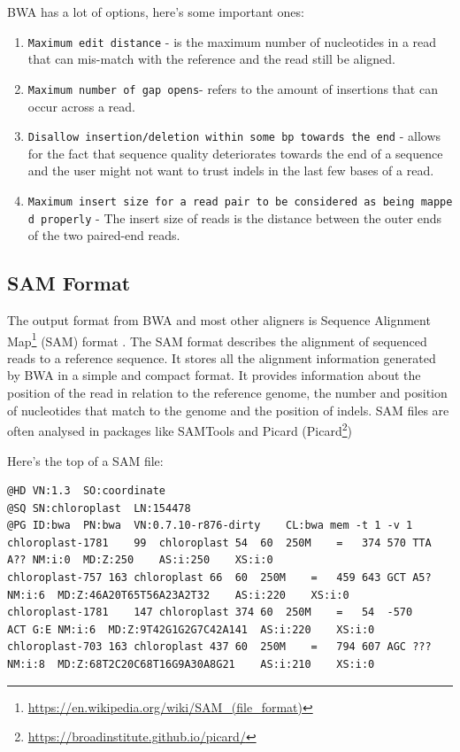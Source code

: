 \documentclass[12pt,]{book}
\providecommand{\tightlist}{%
  \setlength{\itemsep}{0pt}\setlength{\parskip}{0pt}}
\let\rmarkdownfootnote\footnote%
\def\footnote{\protect\rmarkdownfootnote}
\renewcommand{\href}[2]{#2\footnote{\url{#1}}}
\theoremstyle{definition}
\theoremstyle{definition}
\theoremstyle{remark}
\begin{document}
BWA has a lot of options, here's some important ones:

\begin{enumerate}
\def\labelenumi{\arabic{enumi}.}
\tightlist
\item
  \texttt{Maximum\ edit\ distance} - is the maximum number of
  nucleotides in a read that can mis-match with the reference and the
  read still be aligned.
\item
  \texttt{Maximum\ number\ of\ gap\ opens}- refers to the amount of
  insertions that can occur across a read.
\item
  \texttt{Disallow\ insertion/deletion\ within\ some\ bp\ towards\ the\ end}
  - allows for the fact that sequence quality deteriorates towards the
  end of a sequence and the user might not want to trust indels in the
  last few bases of a read.
\item
  \texttt{Maximum\ insert\ size\ for\ a\ read\ pair\ to\ be\ considered\ as\ being\ mapped\ properly}
  - The insert size of reads is the distance between the outer ends of
  the two paired-end reads.
\end{enumerate}

\subsection{SAM Format}\label{sam-format}

The output format from BWA and most other aligners is
\href{https://en.wikipedia.org/wiki/SAM_(file_format)}{Sequence
Alignment Map} (SAM) format \citep{Li:2009ka}. The SAM format describes
the alignment of sequenced reads to a reference sequence. It stores all
the alignment information generated by BWA in a simple and compact
format. It provides information about the position of the read in
relation to the reference genome, the number and position of nucleotides
that match to the genome and the position of indels. SAM files are often
analysed in packages like SAMTools \citep{Li:2009ka} and Picard
(\href{https://broadinstitute.github.io/picard/}{Picard})

Here's the top of a SAM file:

\begin{verbatim}
@HD VN:1.3  SO:coordinate
@SQ SN:chloroplast  LN:154478
@PG ID:bwa  PN:bwa  VN:0.7.10-r876-dirty    CL:bwa mem -t 1 -v 1
chloroplast-1781    99  chloroplast 54  60  250M    =   374 570 TTA A?? NM:i:0  MD:Z:250    AS:i:250    XS:i:0
chloroplast-757 163 chloroplast 66  60  250M    =   459 643 GCT A5? NM:i:6  MD:Z:46A20T65T56A23A2T32    AS:i:220    XS:i:0
chloroplast-1781    147 chloroplast 374 60  250M    =   54  -570    ACT G:E NM:i:6  MD:Z:9T42G1G2G7C42A141  AS:i:220    XS:i:0
chloroplast-703 163 chloroplast 437 60  250M    =   794 607 AGC ??? NM:i:8  MD:Z:68T2C20C68T16G9A30A8G21    AS:i:210    XS:i:0
\end{verbatim}
\end{document}
